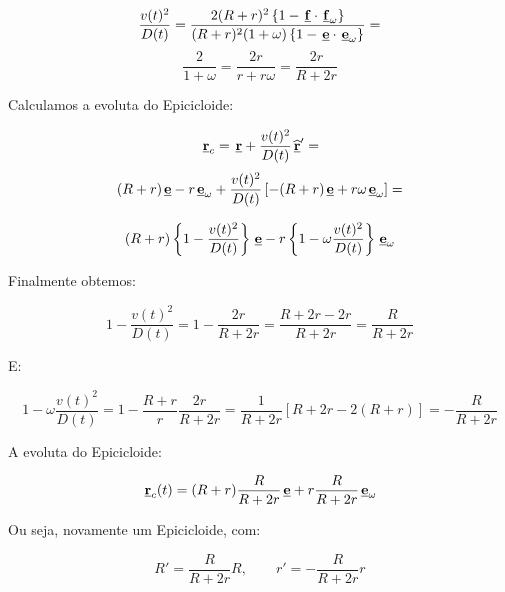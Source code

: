 \[
 \frac{v(t)^2}{D(t)}
 =
 \frac
 {
   2(R+r)^2 \left\{ 1-\hspace{0.05cm} \underline{\mathbf{f}} \cdot \hspace{0.05cm} \underline{\mathbf{f}}_\omega \right\}
 }
 {
   (R+r)^2(1+\omega) \left\{ 1-\hspace{0.05cm} \underline{\mathbf{e}} \cdot \hspace{0.05cm} \underline{\mathbf{e}}_\omega \right\}
 }
 =
\]
\[
 \frac{2}{1+\omega}
 =
 \frac{2r}{r+r\omega}
 =
 \frac{2r}{R+2r}
\]

Calculamos a evoluta do Epicicloide:

\[
 \hspace{0.05cm} \underline{\mathbf{r}}_c
 =
 \hspace{0.05cm} \underline{\mathbf{r}}+\frac{v(t)^2}{D(t)}\hspace{0.05cm} \underline{\mathbf{\widehat{r}}}'
 =
\]
\[
 (R+r) \hspace{0.05cm} \underline{\mathbf{e}}-r \hspace{0.05cm} \underline{\mathbf{e}}_\omega
 +
 \frac{v(t)^2}{D(t)}
 \left[
 -(R+r) \hspace{0.05cm} \underline{\mathbf{e}}+r \omega \hspace{0.05cm} \underline{\mathbf{e}}_\omega 
 \right]
 =
\]

\[
 (R+r) \left\{ 1-\frac{v(t)^2}{D(t)} \right\} \hspace{0.05cm} \underline{\mathbf{e}}
 -
 r \left\{ 1- \omega \frac{v(t)^2}{D(t)} \right\} \hspace{0.05cm} \underline{\mathbf{e}}_\omega 
\]

Finalmente obtemos:

\[
 1-\frac{v(t)^2}{D(t)}
 =
 1-\frac{2r}{R+2r}
 =
 \frac{R+2r-2r}{R+2r}
 =
 \frac{R}{R+2r}
\]

E:

\[
  1- \omega \frac{v(t)^2}{D(t)}
  =
  1-\frac{R+r}{r} \frac{2r}{R+2r}
  =
  \frac{1}{R+2r}
  \left[ R+2r-2(R+r) \right]
  =
  -\frac{R}{R+2r}
\]

A evoluta do Epicicloide:

\[
 \hspace{0.05cm} \underline{\mathbf{r}}_c(t)
 =
 (R+r) \frac{R}{R+2r} \hspace{0.05cm} \underline{\mathbf{e}}
 +
 r \frac{R}{R+2r} \hspace{0.05cm} \underline{\mathbf{e}}_\omega
\]

Ou seja, novamente um Epicicloide, com:

\[
 R'=\frac{R}{R+2r} R,
 \qquad
 r'=-\frac{R}{R+2r} r
\]

